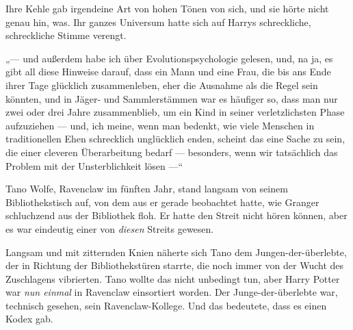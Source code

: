 Ihre Kehle gab irgendeine Art von hohen Tönen von sich, und sie hörte nicht genau hin, was. Ihr ganzes Universum hatte sich auf Harrys schreckliche, schreckliche Stimme verengt.

„— und außerdem habe ich über Evolutionspsychologie gelesen, und, na ja, es gibt all diese Hinweise darauf, dass ein Mann und eine Frau, die bis ans Ende ihrer Tage glücklich zusammenleben, eher die Ausnahme als die Regel sein könnten, und in Jäger- und Sammlerstämmen war es häufiger so, dass man nur zwei oder drei Jahre zusammenblieb, um ein Kind in seiner verletzlichsten Phase aufzuziehen — und, ich meine, wenn man bedenkt, wie viele Menschen in traditionellen Ehen schrecklich unglücklich enden, scheint das eine Sache zu sein, die einer cleveren Überarbeitung bedarf — besonders, wenn wir tatsächlich das Problem mit der Unsterblichkeit lösen —“

\later

Tano Wolfe, Ravenclaw im fünften Jahr, stand langsam von seinem Bibliothekstisch auf, von dem aus er gerade beobachtet hatte, wie Granger schluchzend aus der Bibliothek floh. Er hatte den Streit nicht hören können, aber es war eindeutig einer von \emph{diesen} Streits gewesen.


Langsam und mit zitternden Knien näherte sich Tano dem Jungen-der-überlebte, der in Richtung der Bibliothekstüren starrte, die noch immer von der Wucht des Zuschlagens vibrierten. Tano wollte das nicht unbedingt tun, aber Harry Potter war \emph{nun einmal} in Ravenclaw einsortiert worden. Der Junge-der-überlebte war, technisch gesehen, sein Ravenclaw-Kollege. Und das bedeutete, dass es einen Kodex gab.


